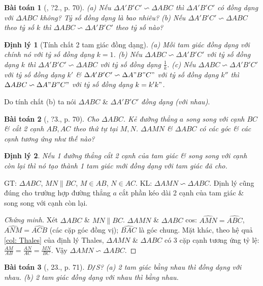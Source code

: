 \documentclass{article}
\newtheorem{baitoan}{Bài toán}
\newtheorem{dinhly}{Định lý}
\begin{document}
\begin{baitoan}[\cite{SGK_Toan_8_tap_2}, ?2., p. 70]
	(a) Nếu $\Delta A'B'C'\backsim\Delta ABC$ thì $\Delta A'B'C'$ có đồng dạng với $\Delta ABC$ không? Tỷ số đồng dạng là bao nhiêu? (b) Nếu $\Delta A'B'C'\backsim\Delta ABC$ theo tỷ số $k$ thì $\Delta ABC\backsim\Delta A'B'C'$ theo tỷ số nào?
\end{baitoan}

\begin{dinhly}[Tính chất 2 tam giác đồng dạng]
	(a) Mỗi tam giác đồng dạng với chính nó với tỷ số đồng dạng $k = 1$. (b) Nếu $\Delta ABC\backsim\Delta A'B'C'$ với tỷ số đồng dạng $k$ thì $\Delta A'B'C'\backsim\Delta ABC$ với tỷ số đồng dạng $\frac{1}{k}$. (c) Nếu $\Delta ABC\backsim\Delta A'B'C'$ với tỷ số đồng dạng $k'$ \& $\Delta A'B'C'\backsim\Delta A"B"C"$ với tỷ số đồng dạng $k''$ thì $\Delta ABC\backsim\Delta A"B"C"$ với tỷ số đồng dạng $k = k'k"$.
\end{dinhly}
Do tính chất (b) ta nói $\Delta ABC$ \& $\Delta A'B'C'$ \textit{đồng dạng (với nhau)}.

\begin{baitoan}[\cite{SGK_Toan_8_tap_2}, ?3., p. 70]
	Cho $\Delta ABC$. Kẻ đường thẳng $a$ song song với cạnh $BC$ \& cắt 2 cạnh $AB,AC$ theo thứ tự tại $M,N$. $\Delta AMN$ \& $\Delta ABC$ có các góc \& các cạnh tương ứng như thế nào?
\end{baitoan}

\begin{dinhly}
	Nếu 1 đường thẳng cắt 2 cạnh của tam giác \& song song với cạnh còn lại thì nó tạo thành 1 tam giác mới đồng dạng với tam giác đã cho.
\end{dinhly}
GT: $\Delta ABC$, $MN\parallel BC$, $M\in AB$, $N\in AC$. KL: $\Delta AMN\backsim\Delta ABC$. Định lý cũng đúng cho trường hợp đường thẳng $a$ cắt phần kéo dài 2 cạnh của tam giác \& song song với cạnh còn lại.

\begin{proof}[Chứng minh]
	Xét $\Delta ABC$ \& $MN\parallel BC$. $\Delta AMN$ \& $\Delta ABC$ cos: $\widehat{AMN} = \widehat{ABC}$, $\widehat{ANM} = \widehat{ACB}$ (các cặp góc đồng vị); $\widehat{BAC}$ là góc chung. Mặt khác, theo hệ quả \ref{col: Thales} của định lý Thales, $\Delta AMN$ \& $\Delta ABC$ có 3 cặp cạnh tương ứng tỷ lệ: $\frac{AM}{AB} = \frac{AN}{AC} = \frac{MN}{BC}$. Vậy $\Delta AMN\backsim\Delta ABC$.
\end{proof}

\begin{baitoan}[\cite{SGK_Toan_8_tap_2}, 23., p. 71]
	\emph{Đ\texttt{/}S?} (a) 2 tam giác bằng nhau thì đồng dạng với nhau. (b) 2 tam giác đồng dạng với nhau thì bằng nhau.
\end{baitoan}
\end{document}
